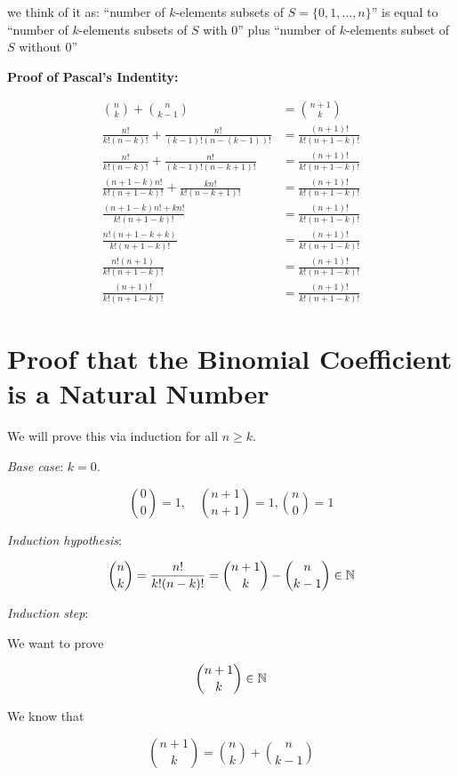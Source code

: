 we think of it as: ``number of \(k\)-elements subsets of \(S = \{0, 1, \dots, n\}\)''  is equal to 
``number of \(k\)-elements subsets of \(S\) with 0'' plus ``number of \(k\)-elements subset of \(S\) without 0''

\textbf{Proof of Pascal's Indentity:}

\begin{align*}
    \binom{n}{k} + \binom{n}{k - 1} &= \binom{n + 1}{k} \\
    \frac{n!}{k! (n - k)!} + \frac{n!}{(k - 1)!(n - (k - 1))!} &= \frac{(n + 1)!}{k!(n + 1 - k)!} \\ 
    \frac{n!}{k! (n - k)!} + \frac{n!}{(k - 1)!(n - k + 1)!} &= \frac{(n + 1)!}{k!(n + 1 - k)!} \\ 
    \frac{(n + 1 - k)n!}{k! (n + 1 - k)!} + \frac{kn!}{k!(n - k + 1)!} &= \frac{(n + 1)!}{k!(n + 1 - k)!} \\ 
    \frac{(n + 1 - k)n! + kn!}{k! (n + 1 - k)!}  &= \frac{(n + 1)!}{k!(n + 1 - k)!} \\ 
    \frac{n!(n + 1 - k + k)}{k! (n + 1 - k)!}  &= \frac{(n + 1)!}{k!(n + 1 - k)!} \\ 
    \frac{n!(n + 1)}{k! (n + 1 - k)!}  &= \frac{(n + 1)!}{k!(n + 1 - k)!} \\ 
    \frac{(n + 1)!}{k! (n + 1 - k)!}  &= \frac{(n + 1)!}{k!(n + 1 - k)!}
\end{align*}

\QED

\section{Proof that the Binomial Coefficient is a Natural Number}

We will prove this via induction for all \(n \ge k\).

\emph{Base case}: \(k = 0\). 

\[
    \binom{0}{0} = 1, \quad \binom{n + 1}{n + 1} = 1, \binom{n}{0} = 1
\]

\emph{Induction hypothesis}:

\[
    \binom{n}{k} = \frac{n!}{k!(n - k)!}  = \binom{n + 1}{k} - \binom{n}{k - 1}\in \mathbb{N}
\]

\emph{Induction step}: 

We want to prove 

\[
    \binom{n + 1}{k} \in \mathbb{N}
\]

We know that 

\[ 
    \binom{n + 1}{k} = \binom{n}{k} + \binom{n}{k  - 1}
\]

